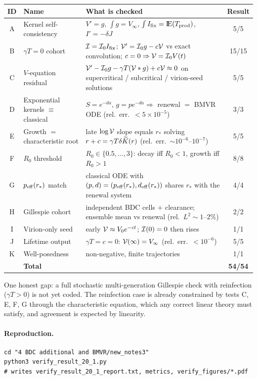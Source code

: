 \begin{center}
\renewcommand{\arraystretch}{1.2}
\small
\begin{tabular}{@{}clp{}c@{}}
\toprule
ID & Name & What is checked & Result \\
\midrule
A & Kernel self-consistency &
  $V'=g$, $\int g=V_\infty$, $\int I_{\mathrm{fix}}={\rm I}\!{\rm E}(T_{\rm prod})$, $I'=-\delta J$ &
  5/5 \\
B & $\gamma T=0$ cohort &
  $\mathcal{I}=\mathcal{I}_0I_{\mathrm{fix}}$; $\mathcal{V}'=\mathcal{I}_0 g-c\mathcal{V}$ vs exact
  convolution; $c=0\Rightarrow\mathcal{V}=\mathcal{I}_0 V(t)$ &
  15/15 \\
C & $V$-equation residual &
  $\mathcal{V}'-\mathcal{I}_0 g-\gamma T(\mathcal{V}*g)+c\mathcal{V}\approx0$ on
  supercritical / subcritical / virion-seed solutions &
  5/5 \\
D & Exponential kernels $\equiv$ classical &
  $S=e^{-da}$, $g=pe^{-da}\Rightarrow$ renewal $=$ BMVR ODE
  (rel.\ err.\ $<5\times10^{-5}$) &
  3/3 \\
E & Growth $=$ characteristic root &
  late $\log\mathcal{V}$ slope equals $r_*$ solving $r+c=\gamma T\delta\widetilde{K}(r)$
  (rel.\ err.\ $\sim10^{-6}$--$10^{-7}$) &
  5/5 \\
F & $R_0$ threshold &
  $R_0\in\{0.5,\ldots,3\}$: decay iff $R_0<1$, growth iff $R_0>1$ &
  8/8 \\
G & $p_{\rm eff}(r_*)$ match &
  classical ODE with $(p,d)=(p_{\rm eff}(r_*),d_{\rm eff}(r_*))$ shares
  $r_*$ with the renewal system &
  4/4 \\
H & Gillespie cohort &
  independent BDC cells $+$ clearance; ensemble mean vs renewal
  (rel.\ $L^2\sim1$--$2\%$) &
  2/2 \\
I & Virion-only seed &
  early $\mathcal{V}\approx V_0e^{-ct}$; $\mathcal{I}(0)=0$ then rises &
  1/1 \\
J & Lifetime output &
  $\gamma T=c=0$: $\mathcal{V}(\infty)=V_\infty$ (rel.\ err.\ $<10^{-6}$) &
  5/5 \\
K & Well-posedness &
  non-negative, finite trajectories &
  1/1 \\
\midrule
 & \textbf{Total} & & \textbf{54/54} \\
\bottomrule
\end{tabular}
\end{center}

One honest gap: a full stochastic multi-generation Gillespie check with
reinfection ($\gamma T>0$) is not yet coded. The reinfection case is
already constrained by tests C, E, F, G through the characteristic
equation, which any correct linear theory must satisfy, and agreement is
expected by linearity.

\paragraph{Reproduction.}
\begin{verbatim}
cd "4 BDC additional and BMVR/new_notes3"
python3 verify_result_20_1.py
# writes verify_result_20_1_report.txt, metrics, verify_figures/*.pdf
\end{verbatim}
